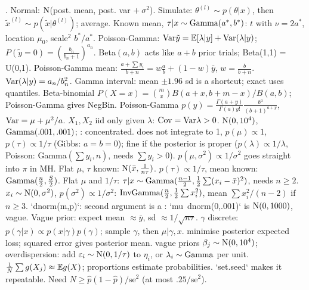 \sk{} . Normal: $\mathrm{N}$(post. mean, post. var $+\ \sigma^2$). Simulate: $\theta^{(l)}\sim p(\theta|x)$, then $\tilde x^{(l)}\sim p(\tilde x|\theta^{(l)})$; average. Known mean, $\tau|x\sim\mathrm{Gamma}(a^*,b^*)$: $t$ with $\nu=2a^*$, location $\mu_0$, scale$^2$ $b^*/a^*$. Poisson-Gamma: $\mathrm{Var}\tilde y=\mathbb{E}[\lambda|y]+\mathrm{Var}(\lambda|y)$; $P(\tilde y=0)=(\frac{b_n}{b_n+1})^{a_n}$.
\sk{} Beta$(a,b)$ acts like $a+b$ prior trials; Beta(1,1) = U(0,1). Poisson-Gamma mean: $\frac{a+\sum y_i}{b+n}=w\frac ab+(1-w)\bar y$, $w=\frac b{b+n}$. $\mathrm{Var}(\lambda|y)=a_n/b_n^2$. Gamma interval: mean $\pm1.96$ sd is a shortcut; exact uses quantiles.
\sk{} Beta-binomial $P(X{=}x)=\binom mx B(a+x,b+m-x)/B(a,b)$; Poisson-Gamma gives NegBin. Poisson-Gamma $p(y)=\frac{\Gamma(a+y)}{\Gamma(a)y!}\frac{b^a}{(b+1)^{a+y}}$, $\mathrm{Var}=\mu+\mu^2/a$. $X_1,X_2$ iid only given $\lambda$: $\mathrm{Cov}=\mathrm{Var}\lambda>0$.
\sk{}  $\mathrm{N}(0,10^4)$, $\mathrm{Gamma}(.001,.001)$; : concentrated.  does not integrate to 1, $p(\mu)\propto1$, $p(\tau)\propto1/\tau$ (Gibbs: $a=b=0$); fine if the posterior is proper ($p(\lambda)\propto1/\lambda$, Poisson: Gamma$(\sum y_i,n)$, needs $\sum y_i>0$). $p(\mu,\sigma^2)\propto1/\sigma^2$ goes straight into $\pi$ in MH. Flat $\mu$, $\tau$ known: $\mathrm{N}(\bar x,\frac1{n\tau})$. $p(\tau)\propto1/\tau$, mean known: $\mathrm{Gamma}(\frac n2,\frac S2)$. Flat $\mu$ and $1/\tau$: $\tau|x\sim\mathrm{Gamma}(\frac{n-1}2,\frac12\sum(x_i-\bar x)^2)$, needs $n\ge2$. $x_i\sim\mathrm{N}(0,\sigma^2)$, $p(\sigma^2)\propto1/\sigma^2$: $\mathrm{InvGamma}(\frac n2,\frac12\sum x_i^2)$, mean $\sum x_i^2/(n-2)$ if $n\ge3$.
\sk{} `dnorm(m,p)`: second argument is a : `mu~dnorm(0,.001)` is $\mathrm{N}(0,1000)$, vague. Vague prior: expect mean $\approx\bar y$, sd $\approx1/\sqrt{n\tau}$.
\sk{} $\gamma$ discrete: $p(\gamma|x)\propto p(x|\gamma)p(\gamma)$; sample $\gamma$, then $\mu|\gamma,x$.
\sk{} minimise posterior expected loss; squared error gives posterior mean.  vague priors $\beta_j\sim\mathrm{N}(0,10^4)$; overdispersion: add $\varepsilon_i\sim\mathrm{N}(0,1/\tau)$ to $\eta_i$, or $\lambda_i\sim\mathrm{Gamma}$ per unit.
  $\frac1N\sum g(X_j)\approx\mathbb{E} g(X)$; proportions estimate probabilities. `set.seed` makes it repeatable. Need $N\ge\hat p(1-\hat p)/\mathrm{se}^2$ (at most $.25/\mathrm{se}^2$). 
